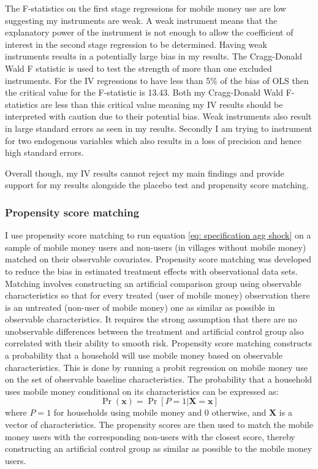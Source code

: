 The F-statistics on the first stage regressions for mobile money use are low suggesting my instruments are weak. A weak instrument means that the explanatory power of the instrument is not enough to allow the coefficient of interest in the second stage regression to be determined. Having weak instruments results in a potentially large bias in my results. The Cragg-Donald Wald F statistic is used to test the strength of more than one excluded instruments. For the IV regressions to have less than 5\% of the bias of OLS then the critical value for the F-statistic is 13.43. Both my Cragg-Donald Wald F-statistics are less than this critical value meaning my IV results should be interpreted with caution due to their potential bias. Weak instruments also result in large standard errors as seen in my results. Secondly I am trying to instrument for two endogenous variables which also results in a loss of precision and hence high standard errors. 

Overall though, my IV results cannot reject my main findings and provide support for my results alongside the placebo test and propensity score matching. 

\subsubsection{Propensity score matching}
I use propensity score matching to run equation \eqref{eq: specification agg shock} on a sample of mobile money users and non-users (in villages without mobile money) matched on their observable covariates. Propensity score matching was  developed to reduce the bias in estimated treatment effects with observational data sets. Matching involves constructing an artificial comparison group using observable characteristics so that for every treated (user of mobile money) observation there is an untreated (non-user of mobile money) one as similar as possible in observable characteristics. It requires the strong assumption that there are no unobservable differences between the treatment and artificial control group also correlated with their ability to smooth risk.    
Propensity score matching constructs a probability that a household will use mobile money based on observable characteristics. This is done by running a probit regression on mobile money use on the set of observable baseline characteristics. The probability that a household uses mobile money conditional on its characteristics can be expressed as: 
\begin{equation}
\Pr(\mathbf{x})=\Pr[P=1|\mathbf{X=x}]
\end{equation}
where $P=1$ for households using mobile money and 0 otherwise, and $\mathbf{X}$ is a vector of characteristics. The propensity scores are then used to match the mobile money users with the corresponding non-users with the closest score, thereby constructing an artificial control group as similar as possible to the mobile money users. 


